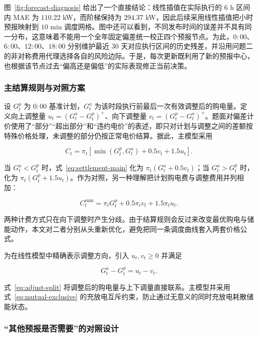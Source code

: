 图~\ref{fig:forecast-diagnosis} 给出了一个直接结论：线性插值在实际执行的 $6$ h 区间内 MAE 为 $110.22$ kW，而阶梯保持为 $294.37$ kW，因此后续采用线性插值把小时预报映射到 $10$ min 调度网格。图中还可以看到，不同发布时间的误差并不具有同一分布，这意味着不能用一个全年固定偏差统一校正四个预报节点。为此，$0{:}00$、$6{:}00$、$12{:}00$、$18{:}00$ 分别维护最近 $30$ 天对应执行区间的历史残差，并沿用问题二的非对称费用代理选择各自的风险边际。于是，每次更新既利用了新的预报中心，也根据该节点过去“偏高还是偏低”的实际表现修正当前决策。

\subsubsection{主结算规则与对照方案}
\label{sec:settlement}

设 $G^p_t$ 为 $0{:}00$ 基准计划，$G^a_t$ 为该时段执行前最后一次有效调整后的购电量。定义向上调整量 $u_t=(G^a_t-G^p_t)^+$、向下调整量 $v_t=(G^p_t-G^a_t)^+$。题面对偏差计价使用了“部分”“超出部分”和“违约电价”的表述，即只对计划与调整之间的差额按特殊价格处理，未调整的部分仍按正常电价结算。据此，主模型采用

\begin{equation}
    C_t=\pi_t\left[\min(G^p_t,G^a_t)+0.5v_t+1.5u_t\right].
    \label{eq:settlement-main}
\end{equation}

当 $G^a_t<G^p_t$ 时，式~\eqref{eq:settlement-main} 化为 $\pi_t(G^a_t+0.5v_t)$；当 $G^a_t>G^p_t$ 时，化为 $\pi_t(G^p_t+1.5u_t)$。作为对照，另一种理解把计划购电费与调整费用并列相加：

\begin{equation}
    C_t^{\text{sum}}=\pi_tG^p_t+0.5\pi_tv_t+1.5\pi_tu_t .
    \label{eq:settlement-sum}
\end{equation}

两种计费方式只在向下调整时产生分歧。由于结算规则会反过来改变最优购电与储能动作，本文对二者分别从头重新优化，避免把同一条调度曲线套入两套价格公式。

为在线性模型中精确表示调整方向，引入 $u_t,v_t\ge0$ 并满足

\begin{equation}
    G^a_t-G^p_t=u_t-v_t .
    \label{eq:adjust-split}
\end{equation}

式~\eqref{eq:adjust-split} 将调整后的购电量与上下调量直接联系。主模型并采用式~\eqref{eq:mutual-exclusive} 的充放电互斥约束，防止通过无意义的同时充放电耗散储能状态。

\subsubsection{“其他预报是否需要”的对照设计}

